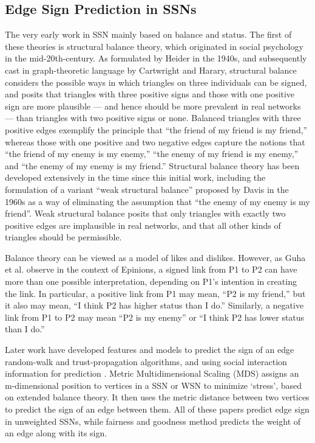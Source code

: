 \documentclass{article}
\begin{document}
\subsection{Edge Sign Prediction in SSNs}
The very early work in 
SSN mainly based on balance and status. The first of these 
theories is structural balance theory, which originated in 
social psychology in the mid-20th-century. As formulated by 
Heider in the 1940s\cite{heider1940}, and subsequently cast 
in graph-theoretic language by Cartwright and 
Harary\cite{Cartwright1956-CARSBA-4}, structural balance 
considers the possible ways in which triangles on three 
individuals can be signed, and posits that triangles with 
three positive signs and those with one positive sign are 
more plausible — and hence should be more prevalent in real 
networks — than triangles with two positive signs or none. 
Balanced triangles with three positive edges exemplify the 
principle that “the friend of my friend is my friend,” whereas 
those with one positive and two negative edges capture the 
notions that “the friend of my enemy is my enemy,” 
“the enemy of my friend is my enemy,” and 
“the enemy of my enemy is my friend.” 
Structural balance theory has been developed extensively 
in the time since this initial work\cite{wasserman1994social}, 
including the formulation of a variant “weak structural balance” 
proposed by Davis in the 1960s \cite{Davis1967}as a way of 
eliminating the assumption that “the enemy of my enemy is my 
friend”. Weak structural balance posits that only triangles 
with exactly two positive edges are implausible in real 
networks, and that all other kinds of triangles should be 
permissible.

Balance theory can be viewed as a model of likes and dislikes. 
However, as Guha et al. observe in the context of 
Epinions\cite{Guha:2004:PTD:988672.988727}, a signed link from 
P1 to P2 can have more than one possible interpretation, 
depending on P1’s intention in creating the link. 
In particular, a positive link from P1 may mean, 
“P2 is my friend,” but it also may mean, “I think P2 has higher 
status than I do.” Similarly, a negative link from P1 to P2 may
 mean “P2 is my enemy” or “I think P2 has lower status than 
 I do.”

Later work have developed features and models to predict the 
sign of an edge random-walk and trust-propagation 
algorithms\cite{Dubois}\cite{Guha:2004:PTD:988672.988727}, 
and using social interaction information for prediction
\cite{Yang2012}\cite{Tang:2016:SSN:2988524.2956185}. Metric 
Multidimensional Scaling (MDS) assigns an m-dimensional 
position to vertices in a SSN or WSN to minimize ‘stress’, 
based on extended balance theory\cite{Qian:2014:FTD:2639948.2628438}. 
It then uses the metric distance between two vertices to 
predict the sign of an edge between them. All of these papers 
predict edge sign in unweighted SSNs, while fairness and 
goodness method predicts the weight of an edge along with its 
sign. 
\end{document}
